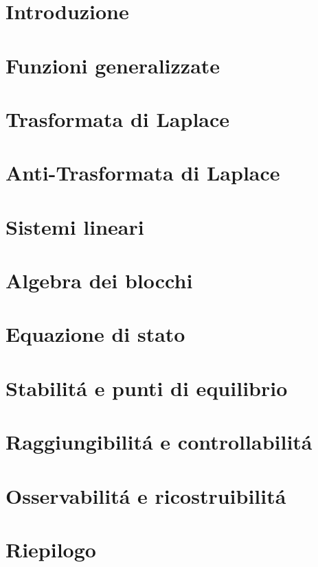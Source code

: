 \documentclass{report}
\begin{document}
	
	
	
	\titleTdS
	\pagebreak
	\pagebreak
	\tableofcontents
	\listofexercises
	\pagebreak
	\chapter{Introduzione}
		
	\pagebreak
	\chapter{Funzioni generalizzate}
	
	\pagebreak
	\chapter{Trasformata di Laplace}
	
	\pagebreak
	\chapter{Anti-Trasformata di Laplace}
	
	\pagebreak
	\chapter{Sistemi lineari}
	
	
	
	
	
	\pagebreak
	\chapter{Algebra dei blocchi}
	
	
	\pagebreak
	\chapter{Equazione di stato}
	
	\pagebreak
	\chapter{Stabilit\'a e punti di equilibrio}
	
	\pagebreak
	\chapter{Raggiungibilit\'a e controllabilit\'a}
	
	
	\pagebreak
	\chapter{Osservabilit\'a e ricostruibilit\'a}
	
	\pagebreak
	\chapter{Riepilogo}
	
	
\end{document}
